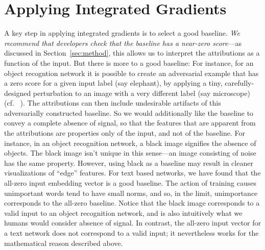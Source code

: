 \section{Applying Integrated Gradients}
\label{sec:applying}
 A key step in applying integrated
gradients is to select a good baseline. \emph{We recommend that
  developers check that the baseline has a near-zero score}---as
discussed in Section~\ref{sec:method}, this allows us to interpret the
attributions as a function of the input.  But there is more to a good
baseline: For instance, for an object recogntion network it is
possible to create an adversarial example that has a zero score for a
given input label (say elephant), by applying a tiny,
carefully-designed perturbation to an image with a very different
label (say microscope) (cf. ~\cite{adversarial}). The attributions can
then include undesirable artifacts of this adversarially constructed
baseline.  So we would additionally like the baseline to convey a
complete absence of signal, so that the features that are apparent
from the attributions are properties only of the input, and not of the
baseline. For instance, in an object recognition network, a black
image signifies the absence of objects. The black image isn't unique
in this sense---an image consisting of noise has the same
property. However, using black as a baseline may result in cleaner
visualizations of ``edge'' features. For text based networks, we have
found that the all-zero input embedding vector is a good baseline. The
action of training causes unimportant words tend to have small norms,
and so, in the limit, unimportance corresponds to the all-zero
baseline. Notice that the black image corresponds to a valid input to
an object recognition network, and is also intuitively what we humans
would consider absence of signal. In contrast, the all-zero input
vector for a text network does not correspond to a valid input; it
nevertheless works for the mathematical reason described above.


